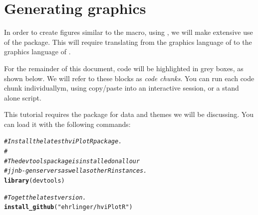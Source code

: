 \documentclass[nojss]{jss}\usepackage[]{graphicx}\usepackage[]{color}
\makeatletter
\newcommand{\hlstr}[1]{\textcolor[rgb]{0.192,0.494,0.8}{#1}}%
\newcommand{\hlcom}[1]{\textcolor[rgb]{0.678,0.584,0.686}{\textit{#1}}}%
\newcommand{\hlstd}[1]{\textcolor[rgb]{0.345,0.345,0.345}{#1}}%
\newcommand{\hlkwd}[1]{\textcolor[rgb]{0.737,0.353,0.396}{\textbf{#1}}}%
\newenvironment{kframe}{%
 \def\at@end@of@kframe{}%
 \ifinner\ifhmode%
  \def\at@end@of@kframe{\end{minipage}}%
  \begin{minipage}{\columnwidth}%
 \fi\fi%
 \def\FrameCommand##1{\hskip\@totalleftmargin \hskip-\fboxsep
 \colorbox{shadecolor}{##1}\hskip-\fboxsep
     \hskip-\linewidth \hskip-\@totalleftmargin \hskip\columnwidth}%
 \MakeFramed {\advance\hsize-\width
   \@totalleftmargin\z@ \linewidth\hsize
   \@setminipage}}%
 {\par\unskip\endMakeFramed%
 \at@end@of@kframe}
\newenvironment{knitrout}{}{} %
\makeatother
\begin{document}
\section[Generating ggplot2 graphics]{Generating  graphics}\label{S:ggplot2tuple}

In order to create figures similar to the  macro, using , we will make extensive use of the  package. This will require translating from the graphics language of  to the graphics language of . 

For the remainder of this document,  code will be highlighted in grey boxes, as shown below. We will refer to these blocks as \emph{code chunks}. You can run each code chunk individuallym, using copy/paste into an interactive  session, or a stand alone  script.

This tutorial requires the  package for data and themes we will be discussing. You can load it with the following commands:
\begin{knitrout}\footnotesize
{}\color{fgcolor}\begin{kframe}
\begin{alltt}
\hlcom{# Install the latest hviPlotR package.}
\hlcom{#}
\hlcom{# The devtools package is installed on all our }
\hlcom{# jjnb-gen servers as well as other R instances.}
\hlkwd{library}\hlstd{(devtools)}

\hlcom{# To get the latest version.}
\hlkwd{install_github}\hlstd{(}\hlstr{"ehrlinger/hviPlotR"}\hlstd{)}
\end{alltt}
\end{kframe}
\end{knitrout}
\end{document}
